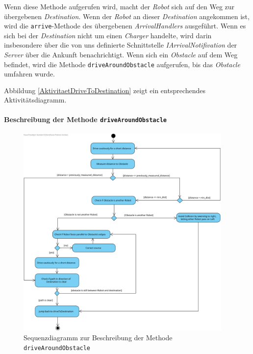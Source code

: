 			Wenn diese Methode aufgerufen wird, macht der \textit{Robot} sich auf den Weg zur 
			übergebenen \textit{Destination}. Wenn der \textit{Robot} an dieser \textit{Destination} 
			angekommen ist, wird die \texttt{arrive}-Methode des übergebenen \textit{ArrivalHandlers} ausgeführt. Wenn es sich bei der \textit{Destination} nicht um einen \textit{Charger} handelte, wird darin insbesondere über die von uns definierte Schnittstelle \textit{IArrivalNotifivation} der \textit{Server} über die Ankunft benachrichtigt. 
			Wenn sich ein \textit{Obstacle} auf dem Weg befindet, wird die Methode \texttt{driveAroundObstacle} 
			aufgerufen, bis das \textit{Obstacle} umfahren wurde.
			
			Abbildung \ref{AktivitaetDriveToDestination} zeigt ein entsprechendes Aktivitätsdiagramm.

			\paragraph{Beschreibung der Methode \texttt{driveAroundObstacle}}
			\begin{figure}[H]
			\centering
			\includegraphics[width=0.95\textwidth]{img/1-Entwurf-7-driveAroundObstacle}
			\caption{Sequenzdiagramm zur Beschreibung der Methode \texttt{driveAroundObstacle}}
			\label{SequenzDriveAroundObstacle}
			\end{figure}

